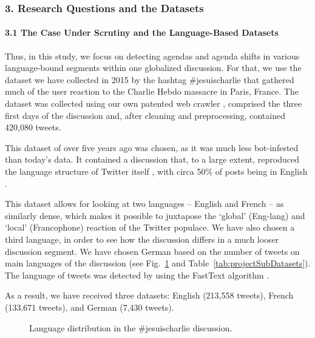 \subsubsection{3. Research Questions and the Datasets}

\paragraph{3.1 The Case Under Scrutiny and the Language-Based Datasets}
Thus, in this study, we focus on detecting agendas and agenda shifts in various language-bound segments within one globalized discussion. For that, we use the dataset we have collected in 2015 by the hashtag \#jesuischarlie that gathered much of the user reaction to the Charlie Hebdo massacre in Paris, France. The dataset was collected using our own patented web crawler \cite{BodrunovaBlekanovKukarkin}, comprised the three first days of the discussion and, after cleaning and preprocessing, contained 420,080 tweets.

This dataset of over five years ago was chosen, as it was much less bot-infested than today’s data. It contained a discussion that, to a large extent, reproduced the language structure of Twitter itself \cite{BlekanovSergeevMartynenko}, with circa 50\% of posts being in English \cite{BodrunovaSmoliarovaBlekanov}.

This dataset allows for looking at two languages -- English and French -- as similarly dense, which makes it possible to juxtapose the ‘global’ (Eng-lang) and ‘local’ (Francophone) reaction of the Twitter populace. We have also chosen a third language, in order to see how the discussion differs in a much looser discussion segment. We have chosen German based on the number of tweets on main languages of the discussion (see Fig.~\cref{fig:charlieHebdoLanguageDistribution} and Table~\cref{tab:projectSubDatasets}). The language of tweets was detected by using the FastText algorithm \cite{MocanuBaronchelliPerra}.

As a result, we have received three datasets: English (213,558 tweets), French (133,671 tweets), and German (7,430 tweets).

\begin{figure}[ht]
	\caption{Language distribution in the \#jesuischarlie discussion.}\label{fig:charlieHebdoLanguageDistribution}
\end{figure}

